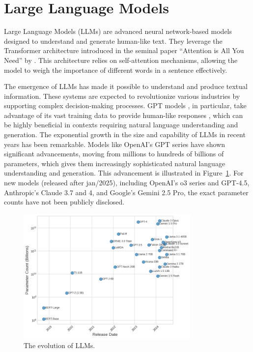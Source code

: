     \section{Large Language Models}         

        Large Language Models (LLMs) are advanced neural network-based models designed to understand and generate human-like text. 
        They leverage the Transformer architecture introduced in the seminal paper \enquote{Attention is All You Need} by \citet{Vaswani2017}. 
        This architecture relies on self-attention mechanisms, allowing the model to weigh the importance of different words in a sentence effectively. 

        The emergence of LLMs has made it possible to understand and produce textual information. 
        These systems are expected to revolutionize various industries by supporting complex decision-making processes. GPT models \citep{OpenAI2023}, in particular, take advantage of its vast training data to provide human-like responses \citep{Mosser2024}, which can be highly beneficial in contexts requiring natural language understanding and generation. The exponential growth in the size and capability of LLMs in recent years has been remarkable. Models like OpenAI's GPT series have shown significant advancements, moving from millions to hundreds of billions of parameters, which gives them increasingly sophisticated natural language understanding and generation. This advancement is illustrated in Figure~\ref{fig:llm_evolution}. For new models (released after jan/2025), including OpenAI's o3 series and GPT-4.5, Anthropic's Claude 3.7 and 4, and Google's Gemini 2.5 Pro, the exact parameter counts have not been publicly disclosed. 


        \begin{figure}[ht]
            \centering
            \includegraphics[width=0.8\textwidth]{images/llm_evolution.png}
            \caption{The evolution of LLMs.}
            \label{fig:llm_evolution}
        \end{figure}
                
